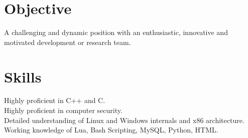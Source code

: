 \documentclass[margin]{res}
\begin{document}
 
 

\address{david.andrews112@gmail.com \ \ \ (949) 633-0588}


 
\begin{resume}  

\section{Objective}
A challenging and dynamic position with an enthusiastic, innovative and motivated development or research team.


\section{Skills}
\noindent
Highly proficient in C++ and C. \\
Highly proficient in computer security. \\
Detailed understanding of Linux and Windows internals and x86 architecture. \\
Working knowledge of Lua, Bash Scripting, MySQL, Python, HTML.






\end{resume}
\end{document}
